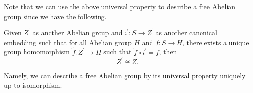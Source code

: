 Note that we can use the above \hyperref[thm:universal-property-of-free-Abelian-group-generated-by-a-set]{universal property} to describe a
\hyperref[def:free-Abelian-group]{free Abelian group} since we have the following.
\begin{proposition}
	Given \(Z^\prime \) as another \hyperref[def:Abelian-group]{Abelian group} and \(i^\prime \colon S\to Z^\prime \) as another canonical embedding such that for all \hyperref[def:Abelian-group]{Abelian group} \(H\)
	and \(f\colon S\to H\), there exists a unique group homomorphism \(\widetilde{f} \colon Z^\prime \to H\) such that \(\widetilde{f} \circ i^\prime = f\), then
	\[
		Z^\prime \cong Z.
	\]
\end{proposition}

Namely, we can describe a \hyperref[def:free-Abelian-group]{free Abelian group} by its \hyperref[thm:universal-property-of-free-Abelian-group-generated-by-a-set]{universal property}
uniquely up to isomorphism.

